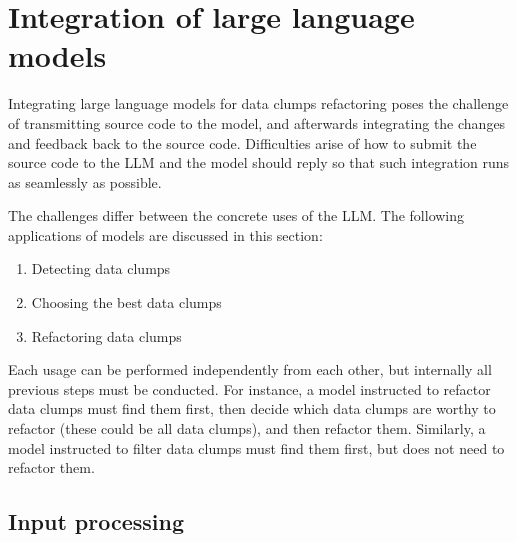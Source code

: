 \section{Integration of large language models}\label{sec:implementation_tools}
Integrating large language models for data clumps refactoring poses the challenge of transmitting source code to the model, and afterwards integrating the changes and  feedback back to the source code. Difficulties arise of how to submit the source code to the \ac{LLM} and  the model should reply so that such integration runs as seamlessly as possible. 

The challenges differ between the concrete uses of the \ac{LLM}. The following applications of models are discussed in this section:
\begin{enumerate}
    \item Detecting data clumps
    \item Choosing the best data clumps
    \item Refactoring data clumps
\end{enumerate}

Each usage can be performed independently from each other, but internally all previous steps must be conducted. For instance, a model instructed to refactor data clumps must find them first, then decide which data clumps are worthy to refactor (these could be all data clumps), and then refactor them. Similarly, a model instructed to filter data clumps must find them first, but does not need to refactor them.

\subsection{Input processing}

